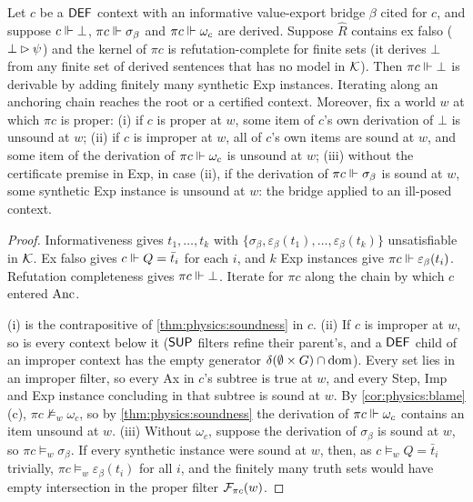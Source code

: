 \begin{proposition}\label{prop:physics:propagation}
Let $c$ be a $\mathsf{DEF}$ context with an informative value-export bridge $\beta$ cited for $c$,
and suppose $c\Vdash\bot$, $\pi c\Vdash\sigma_\beta$ and $\pi c\Vdash\omega_c$ are derived.
Suppose $\hat R$ contains ex falso ($\bot\rhd\psi$) and the kernel of $\pi c$ is
refutation-complete for finite sets (it derives $\bot$ from any finite set of derived
sentences that has no model in $\mathcal{K}$). Then $\pi c\Vdash\bot$ is derivable by adding finitely
many synthetic Exp instances. Iterating along an anchoring chain reaches the root or a
certified context. Moreover, fix a world $w$ at which $\pi c$ is proper:
\textup{(i)} if $c$ is proper at $w$, some item of $c$'s own derivation of $\bot$ is unsound
at $w$; \textup{(ii)} if $c$ is improper at $w$, all of $c$'s own items are sound at $w$, and
some item of the derivation of $\pi c\Vdash\omega_c$ is unsound at $w$; \textup{(iii)}
without the certificate premise in Exp, in case (ii), if the derivation of
$\pi c\Vdash\sigma_\beta$ is sound at $w$, some synthetic Exp instance is unsound at $w$: the
bridge applied to an ill-posed context.
\end{proposition}
\begin{proof}
Informativeness gives $t_1,\dots,t_k$ with $\{\sigma_\beta,\varepsilon_\beta(t_1),\dots,\varepsilon_\beta(t_k)\}$
unsatisfiable in $\mathcal{K}$. Ex falso gives $c\Vdash Q=\bar t_i$ for each $i$, and $k$ Exp
instances give $\pi c\Vdash\varepsilon_\beta(t_i)$. Refutation completeness gives
$\pi c\Vdash\bot$. Iterate for $\pi c$ along the chain by which $c$ entered $\mathrm{Anc}$.

(i) is the contrapositive of \cref{thm:physics:soundness} in $c$. (ii) If $c$ is improper at
$w$, so is every context below it ($\mathsf{SUP}$ filters refine their parent's, and a $\mathsf{DEF}$ child of
an improper context has the empty generator $\delta(\emptyset\times G)\cap\operatorname{dom}$). Every set
lies in an improper filter, so every Ax in $c$'s subtree is true at $w$, and every Step, Imp
and Exp instance concluding in that subtree is sound at $w$. By \cref{cor:physics:blame}(c),
$\pi c\not\models_w\omega_c$, so by \cref{thm:physics:soundness} the derivation of
$\pi c\Vdash\omega_c$ contains an item unsound at $w$. (iii) Without $\omega_c$, suppose the
derivation of $\sigma_\beta$ is sound at $w$, so $\pi c\models_w\sigma_\beta$. If every synthetic
instance were sound at $w$, then, as $c\models_w Q=\bar t_i$ trivially, $\pi c\models_w\varepsilon_\beta(t_i)$
for all $i$, and the finitely many truth sets would have empty intersection in the proper
filter $\mathcal{F}_{\pi c}(w)$.
\end{proof}

